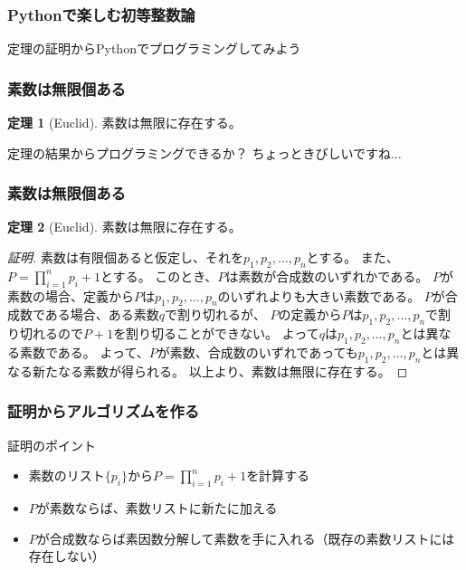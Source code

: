 \documentclass[dvipdfmx,11pt,notheorems]{beamer}
\theoremstyle{definition}
\newtheorem{theorem}{定理}
\begin{document}
\begin{frame}\frametitle{Pythonで楽しむ初等整数論}
\huge{定理の証明からPythonでプログラミングしてみよう}
\end{frame}

\begin{frame}\frametitle{素数は無限個ある}

\begin{theorem}[Euclid]
素数は無限に存在する。
\end{theorem}

\begin{alertblock}{定理の結果からプログラミングできるか？}
ちょっときびしいですね...
\end{alertblock}

\end{frame}

\begin{frame}\frametitle{素数は無限個ある}

\begin{theorem}[Euclid]
素数は無限に存在する。
\end{theorem}

\begin{proof}[証明]

素数は有限個あると仮定し、それを$p_{1}, p_{2}, \dots,  p_{n}$とする。
また、$P = \displaystyle \prod^{n}_{i=1}p_{i} + 1$とする。
このとき、$P$は素数が合成数のいずれかである。
$P$が素数の場合、定義から$P$は$p_{1}, p_{2}, \dots,  p_{n}$のいずれよりも大きい素数である。
$P$が合成数である場合、ある素数$q$で割り切れるが、
$P$の定義から$P$は$p_{1}, p_{2}, \dots,  p_{n}$で割り切れるので$P+1$を割り切ることができない。
よって$q$は$p_{1}, p_{2}, \dots,  p_{n}$とは異なる素数である。
よって、$P$が素数、合成数のいずれであっても$p_{1}, p_{2}, \dots,  p_{n}$とは異なる新たなる素数が得られる。
以上より、素数は無限に存在する。
\end{proof}

\end{frame}

\begin{frame}\frametitle{証明からアルゴリズムを作る}

\begin{block}{証明のポイント}
\begin{itemize}
\item 素数のリスト$\{p_{i}\}$から$P = \displaystyle \prod^{n}_{i=1}p_{i} + 1$を計算する
\item $P$が素数ならば、素数リストに新たに加える
\item $P$が合成数ならば素因数分解して素数を手に入れる（既存の素数リストには存在しない）
\end{itemize}
\end{block}

\end{frame}
\end{document}

